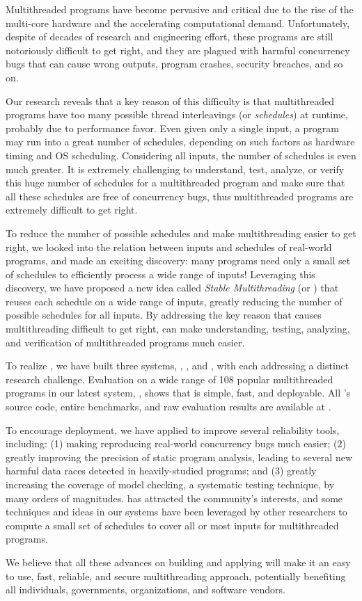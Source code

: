 Multithreaded programs have become pervasive and critical due to the rise of the
multi-core hardware and the accelerating computational demand.
Unfortunately, despite of decades of research and engineering effort, these
programs are still notoriously difficult to get right, and they are plagued with
harmful concurrency bugs that can cause wrong outputs, program crashes, security
breaches, and so on.

Our research reveals that a key reason of this difficulty is
that multithreaded programs have too many possible thread interleavings (or
\emph{schedules}) at runtime, probably due to performance favor. Even given 
only a single input, a program may run into a great number of schedules, 
depending on such factors as hardware timing and OS scheduling. Considering all 
inputs, the number of schedules is even much greater. It is extremely 
challenging to understand, test, analyze, or verify this huge number of 
schedules for a multithreaded program and make sure that all these schedules 
are free of concurrency bugs, thus multithreaded programs are extremely 
difficult to get right.

To reduce the number of possible schedules and make multithreading
easier to get right, we looked into the relation between inputs and schedules 
of real-world programs, and made an exciting discovery: many programs need only 
a small set of schedules to efficiently process a wide range of inputs! 
Leveraging this discovery, we have proposed a new idea called \emph{Stable 
Multithreading} (or \emph{\smt}) that reuses each schedule on a wide range of 
inputs, greatly reducing the number of possible schedules for all inputs. By 
addressing the key reason that causes multithreading difficult to get right, 
\smt can make understanding, testing, analyzing, and verification of 
multithreaded programs much easier.

To realize \smt, we have built three \smt systems, \tern, \peregrine, and 
\parrot, with each addressing a distinct research challenge. Evaluation on a 
wide range of 108 popular multithreaded programs in our latest \smt system, 
\parrot, shows that \smt is simple, fast, and deployable. All \parrot's source 
code, entire benchmarks, and raw evaluation results are available at \github.

To encourage deployment, we have applied \smt to improve several reliability 
tools, including: (1) making reproducing
real-world concurrency bugs much easier;  (2) greatly improving the precision of
static program analysis, leading to several new harmful data races detected in
heavily-studied programs; and (3) greatly increasing the coverage of model 
checking, a systematic testing technique, by many orders of magnitudes. \smt 
has attracted the community's interests, and some techniques and ideas in our 
\smt systems have been leveraged by other researchers to compute a small set of 
schedules to cover all or most inputs for multithreaded programs.

We believe that all these advances on building and applying \smt will make it 
an easy to use, fast, reliable, and secure multithreading approach, potentially 
benefiting all individuals, governments, organizations, and software vendors. 

